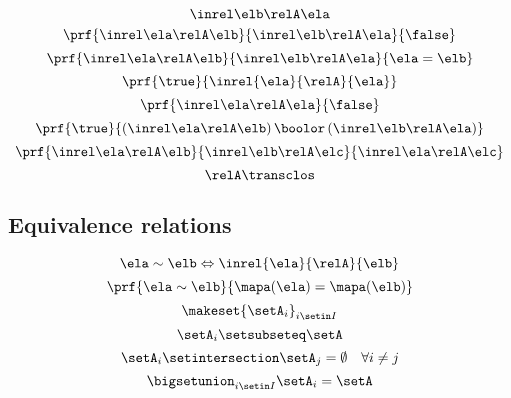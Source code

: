 \begin{forslides}
\begin{equation}
{        }{
            \inrel \elb \relA \ela
        }
\end{equation}
 \begin{equation}\label{eq:slides_session2_151}
\prf{
            \inrel \ela \relA \elb
        }{
            \inrel \elb \relA \ela
        }{
            \false
        }
\end{equation}
\begin{equation}\label{eq:slides_session2_152}
\prf{
            \inrel \ela \relA \elb
        }{
            \inrel \elb \relA \ela
        }{
            \ela = \elb
        }
\end{equation}
 \begin{equation}\label{eq:slides_session2_153}
\prf{\true}{\inrel{\ela}{\relA}{\ela}}
\end{equation}
\begin{equation}\label{eq:slides_session2_154}
\prf{
            \inrel \ela \relA \ela
        }{
            \false
        }
\end{equation}
 \begin{equation}\label{eq:slides_session2_155}
\prf{
            \true
        }{
            (\inrel\ela\relA\elb )\,\boolor\, (\inrel\elb\relA\ela)
        }
\end{equation}
\begin{equation}\label{eq:slides_session2_156}
\prf{
            \inrel \ela \relA \elb
        }{
            \inrel \elb \relA \elc
        }{
            \inrel \ela \relA \elc
        }
\end{equation}
 \begin{equation}\label{eq:slides_session2_157}
\relA\transclos
\end{equation}

\subsection{Equivalence relations}

\begin{equation}\label{eq:slides_session2_158}
\ela\sim \elb \Leftrightarrow \inrel{\ela}{\relA}{\elb}
\end{equation}
 \begin{equation}\label{eq:slides_session2_159}
\prf{
            \ela\sim \elb
        }{
            \mapa(\ela)=\mapa(\elb)
        }
\end{equation}
\begin{equation}\label{eq:slides_session2_160}
\makeset{\setA_i}_{i\setin I}
\end{equation}
 \begin{equation}\label{eq:slides_session2_161}
\setA_i\setsubseteq \setA
\end{equation}
\begin{equation}\label{eq:slides_session2_162}
\setA_i\setintersection \setA_j=\emptyset \quad \forall i\neq j
\end{equation}
 \begin{equation}\label{eq:slides_session2_163}
\bigsetunion_{i\setin I}\setA_i=\setA
\end{equation}


\end{forslides}
